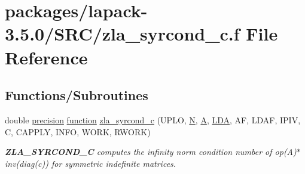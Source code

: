 \hypertarget{zla__syrcond__c_8f}{}\section{packages/lapack-\/3.5.0/\+S\+R\+C/zla\+\_\+syrcond\+\_\+c.f File Reference}
\label{zla__syrcond__c_8f}
\subsection*{Functions/\+Subroutines}
\begin{DoxyCompactItemize}
\item 
double \hyperlink{numinquire_8h_a2c8e616467665d0b2814d4c1589ba74e}{precision} \hyperlink{afunc_8m_a7b5e596df91eadea6c537c0825e894a7}{function} \hyperlink{group__complex16SYcomputational_ga87c9fb2e8d08c82bb038a9cb067a907e}{zla\+\_\+syrcond\+\_\+c} (U\+P\+L\+O, \hyperlink{polmisc_8c_a0240ac851181b84ac374872dc5434ee4}{N}, \hyperlink{classA}{A}, \hyperlink{example__user_8c_ae946da542ce0db94dced19b2ecefd1aa}{L\+D\+A}, A\+F, L\+D\+A\+F, I\+P\+I\+V, C, C\+A\+P\+P\+L\+Y, I\+N\+F\+O, W\+O\+R\+K, R\+W\+O\+R\+K)
\begin{DoxyCompactList}\small\item\em {\bfseries Z\+L\+A\+\_\+\+S\+Y\+R\+C\+O\+N\+D\+\_\+\+C} computes the infinity norm condition number of op(\+A)$\ast$inv(diag(c)) for symmetric indefinite matrices. \end{DoxyCompactList}\end{DoxyCompactItemize}
